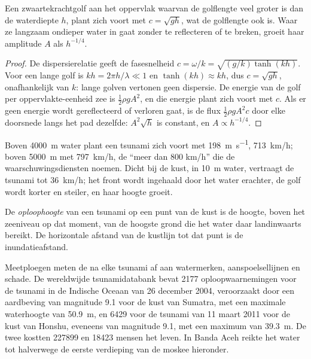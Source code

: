 \begin{proposition}\label{prop:b2:geological-hazards:long-waves}
Een zwaartekrachtgolf aan het oppervlak waarvan de golflengte veel groter is dan de waterdiepte $h$, plant zich voort met
$c = \sqrt{gh}$, wat de golflengte ook is. Waar ze langzaam ondieper water in gaat zonder
te reflecteren of te breken, groeit haar amplitude $A$ als $h^{-1/4}$.
\end{proposition}

\begin{proof}
De dispersierelatie geeft de fasesnelheid $c = \omega/k = \sqrt{(g/k)\tanh(kh)}$. Voor een lange
golf is $kh = 2\pi h/\lambda \ll 1$ en $\tanh(kh) \approx kh$, dus $c = \sqrt{gh}$, onafhankelijk van
$k$: lange golven vertonen geen dispersie. De energie van de golf per oppervlakte-eenheid zee is $\frac12
\rho g A^2$, en die energie plant zich voort met $c$. Als er geen energie wordt gereflecteerd of verloren gaat, is de flux $\frac12\rho g A^2
c$ door elke doorsnede langs het pad dezelfde: $A^2 \sqrt{h}$ is constant, en $A \propto
h^{-1/4}$.
\end{proof}

Boven \qty{4000}{m} water plant een tsunami zich voort met \qty{198}{m.s^{-1}}, \qty{713}{km/h}; boven
\qty{5000}{m} met \qty{797}{km/h}, de ``meer dan 800 km/h'' die de waarschuwingsdiensten noemen. Dicht bij de
kust, in \qty{10}{m} water, vertraagt de tsunami tot \qty{36}{km/h}; het front wordt ingehaald door het water
erachter, de golf wordt korter en steiler, en haar hoogte groeit.

\begin{definition}\label{def:b2:geological-hazards:tsunami}
De \emph{oploophoogte} van een tsunami op een punt van de kust is de hoogte, boven het
zeeniveau op dat moment, van de hoogste grond die het water daar landinwaarts bereikt. De horizontale
afstand van de kustlijn tot dat punt is de inundatieafstand.
\end{definition}

Meetploegen meten de  na elke tsunami af aan watermerken, aanspoelsellijnen en schade. De
wereldwijde tsunamidatabank bevat \num{2177} oploopwaarnemingen voor de tsunami in de Indische Oceaan van
26 december 2004, veroorzaakt door een aardbeving van magnitude 9.1 voor de kust van Sumatra, met een maximale waterhoogte van
\qty{50.9}{m}, en \num{6429} voor de tsunami van 11 maart 2011 voor de kust van Honshu, eveneens van magnitude 9.1,
met een maximum van \qty{39.3}{m}. De twee kostten \num{227899} en \num{18423} mensen het leven. In Banda Aceh
reikte het water tot halverwege de eerste verdieping van de moskee hieronder.

